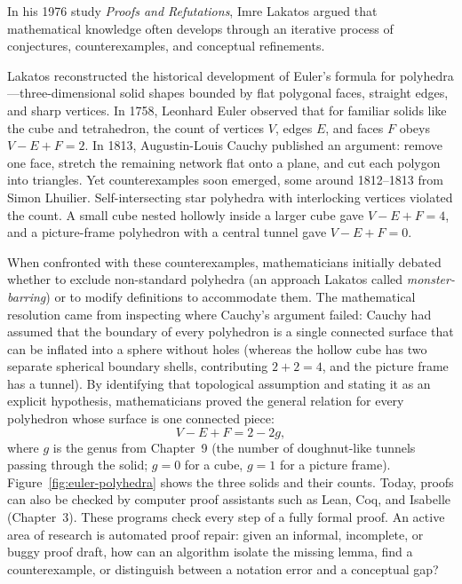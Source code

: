 \begin{historybox}
In his 1976 study \emph{Proofs and Refutations}, Imre Lakatos argued that mathematical knowledge often develops through an iterative process of conjectures, counterexamples, and conceptual refinements.

Lakatos reconstructed the historical development of Euler's formula for polyhedra---three-dimensional solid shapes bounded by flat polygonal faces, straight edges, and sharp vertices. In 1758, Leonhard Euler observed that for familiar solids like the cube and tetrahedron, the count of vertices $V$, edges $E$, and faces $F$ obeys $V - E + F = 2$. In 1813, Augustin-Louis Cauchy published an argument: remove one face, stretch the remaining network flat onto a plane, and cut each polygon into triangles. Yet counterexamples soon emerged, some around 1812--1813 from Simon Lhuilier. Self-intersecting star polyhedra with interlocking vertices violated the count. A small cube nested hollowly inside a larger cube gave $V - E + F = 4$, and a picture-frame polyhedron with a central tunnel gave $V - E + F = 0$.

When confronted with these counterexamples, mathematicians initially debated whether to exclude non-standard polyhedra (an approach Lakatos called \emph{monster-barring}) or to modify definitions to accommodate them. The mathematical resolution came from inspecting where Cauchy's argument failed: Cauchy had assumed that the boundary of every polyhedron is a single connected surface that can be inflated into a sphere without holes (whereas the hollow cube has two separate spherical boundary shells, contributing $2 + 2 = 4$, and the picture frame has a tunnel). By identifying that topological assumption and stating it as an explicit hypothesis, mathematicians proved the general relation for every polyhedron whose surface is one connected piece:
\[
V - E + F = 2 - 2g,
\]
where $g$ is the genus from Chapter~9 (the number of doughnut-like tunnels passing through the solid; $g = 0$ for a cube, $g = 1$ for a picture frame). Figure~\ref{fig:euler-polyhedra} shows the three solids and their counts.
Today, proofs can also be checked by computer proof assistants such as Lean, Coq, and Isabelle (Chapter~3). These programs check every step of a fully formal proof. An active area of research is automated proof repair: given an informal, incomplete, or buggy proof draft, how can an algorithm isolate the missing lemma, find a counterexample, or distinguish between a notation error and a conceptual gap?
\end{historybox}

